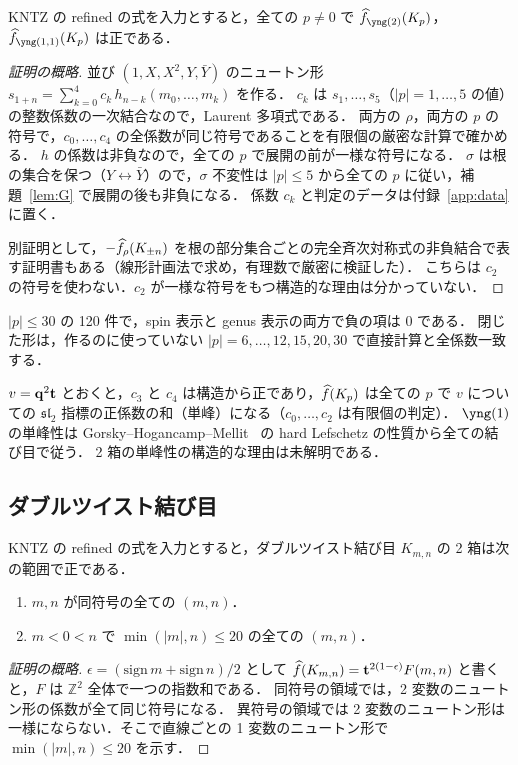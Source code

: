\begin{theorem}[計算機援用]\label{thm:twist}
KNTZ の refined の式を入力とすると，全ての $p\neq0$ で $\hf_{\yng(2)}(K_p)$，$\hf_{\yng(1,1)}(K_p)$ は正である．
\end{theorem}
\begin{proof}[証明の概略]
並び $(1,X,X^2,Y,\bar Y)$ のニュートン形 $s_{1+n}=\sum_{k=0}^{4}c_k\,h_{n-k}(m_0,\dots,m_k)$ を作る．
$c_k$ は $s_1,\dots,s_5$（$|p|=1,\dots,5$ の値）の整数係数の一次結合なので，Laurent 多項式である．
両方の $\rho$，両方の $p$ の符号で，$c_0,\dots,c_4$ の全係数が同じ符号であることを有限個の厳密な計算で確かめる．
$h$ の係数は非負なので，全ての $p$ で展開の前が一様な符号になる．
$\sigma$ は根の集合を保つ（$Y\leftrightarrow\bar Y$）ので，$\sigma$ 不変性は $|p|\le5$ から全ての $p$ に従い，補題~\ref{lem:G} で展開の後も非負になる．
係数 $c_k$ と判定のデータは付録~\ref{app:data} に置く．

別証明として，$-\widehat{f}_\rho(K_{\pm n})$ を根の部分集合ごとの完全斉次対称式の非負結合で表す証明書もある（線形計画法で求め，有理数で厳密に検証した）．
こちらは $c_2$ の符号を使わない．$c_2$ が一様な符号をもつ構造的な理由は分かっていない．
\end{proof}

\begin{compresult}
$|p|\le30$ の 120 件で，spin 表示と genus 表示の両方で負の項は 0 である．
閉じた形は，作るのに使っていない $|p|=6,\dots,12,15,20,30$ で直接計算と全係数一致する．
\end{compresult}

\begin{remark}[単峰性]
$v=\mathbf{q}^2\mathbf{t}$ とおくと，$c_3$ と $c_4$ は構造から正であり，$\widehat{f}(K_p)$ は全ての $p$ で $v$ についての $\mathfrak{sl}_2$ 指標の正係数の和（単峰）になる（$c_0,\dots,c_2$ は有限個の判定）．
$\yng(1)$ の単峰性は Gorsky--Hogancamp--Mellit~\cite{Gorsky21} の hard Lefschetz の性質から全ての結び目で従う．
2 箱の単峰性の構造的な理由は未解明である．
\end{remark}

\subsection{ダブルツイスト結び目}
\begin{theorem}[計算機援用]\label{thm:pretzel}
KNTZ の refined の式を入力とすると，ダブルツイスト結び目 $K_{m,n}$ の 2 箱は次の範囲で正である．
\begin{enumerate}
\item $m,n$ が同符号の全ての $(m,n)$．
\item $m<0<n$ で $\min(|m|,n)\le20$ の全ての $(m,n)$．
\end{enumerate}
\end{theorem}
\begin{proof}[証明の概略]
$\epsilon=(\mathrm{sign}\,m+\mathrm{sign}\,n)/2$ として $\widehat{f}(K_{m,n})=\mathbf{t}^{2(1-\epsilon)}F(m,n)$ と書くと，$F$ は $\mathbb{Z}^2$ 全体で一つの指数和である．
同符号の領域では，2 変数のニュートン形の係数が全て同じ符号になる．
異符号の領域では 2 変数のニュートン形は一様にならない．そこで直線ごとの 1 変数のニュートン形で $\min(|m|,n)\le20$ を示す．
\end{proof}

